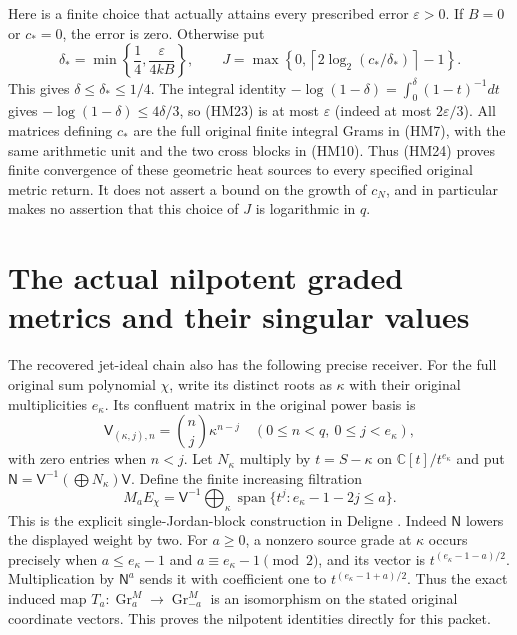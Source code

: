 \documentclass[11pt]{article}
\newcommand{\C}{\mathbb C}\newcommand{\R}{\mathbb R}
\begin{document}
Here is a finite choice that actually attains every prescribed error
$\varepsilon>0$. If $B=0$ or $c_*=0$, the error is zero. Otherwise put
\begin{equation}\tag{HM24}
 \delta_* =\min\left\{\frac14,\frac{\varepsilon}{4kB}\right\},\qquad
 J=\max\left\{0,
       \left\lceil2\log_2(c_*/\delta_*)\right\rceil-1\right\}.
\end{equation}
This gives $\delta\le\delta_*\le1/4$. The integral identity
$-\log(1-\delta)=\int_0^\delta(1-t)^{-1}dt$
gives $-\log(1-\delta)\le4\delta/3$, so (HM23) is at most
$\varepsilon$ (indeed at most $2\varepsilon/3$). All matrices defining
$c_*$ are the full original finite integral Grams in (HM7), with the
same arithmetic unit and the two cross blocks in (HM10).
Thus (HM24) proves finite convergence of these geometric heat sources to
every specified original metric return. It does not assert a bound on
the growth of $c_N$, and in particular makes no assertion that this
choice of $J$ is logarithmic in $q$.

\section{The actual nilpotent graded metrics and their singular values}
The recovered jet-ideal chain also has the following precise receiver.
For the full original sum polynomial $\chi$, write its distinct roots as
$\kappa$ with their original multiplicities $e_\kappa$. Its confluent
matrix in the original power basis is
\[
 \mathsf V_{(\kappa,j),n}=\binom nj\kappa^{n-j}
 \quad(0\le n<q,\ 0\le j<e_\kappa),
\]
with zero entries when $n<j$. Let $N_\kappa$ multiply by $t=S-\kappa$
on $\C[t]/t^{e_\kappa}$ and put
$\mathsf N=\mathsf V^{-1}(\bigoplus N_\kappa)\mathsf V$.
Define the finite increasing filtration
\begin{equation}\tag{HM25}
 M_aE_\chi=\mathsf V^{-1}\bigoplus_\kappa
 \operatorname{span}\{t^j:e_\kappa-1-2j\le a\}.
\end{equation}
This is the explicit single-Jordan-block construction in
Deligne \cite[(1.6.1), (1.6.7)]{Deligne}. Indeed $\mathsf N$ lowers
the displayed weight by two. For $a\ge0$, a nonzero source grade at
$\kappa$ occurs precisely when $a\le e_\kappa-1$ and
$a\equiv e_\kappa-1\pmod2$, and its vector is
$t^{(e_\kappa-1-a)/2}$. Multiplication by $\mathsf N^a$ sends it
with coefficient one to $t^{(e_\kappa-1+a)/2}$. Thus the exact induced
map $T_a:\operatorname{Gr}_a^M\to\operatorname{Gr}_{-a}^M$ is an
isomorphism on the stated original coordinate vectors. This proves
the nilpotent identities directly for this packet.
\end{document}
